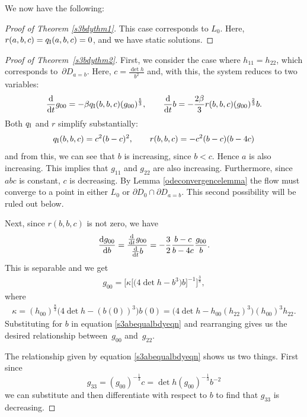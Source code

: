 \documentclass[10pt,a4paper]{amsart}
\numberwithin{equation}{section}
\newcommand{\dtime}{\frac{{\rm d}}{{\rm d} t}} %
\begin{document}
We now have the following:

\begin{proof}[Proof of Theorem \ref{s3bdythm1}]
This case corresponds to $L_0$. Here, $r(a, b, c) = q_{\rm I}(a, b, c) = 0$, and we have static solutions.
\end{proof}

\begin{proof}[Proof of Theorem~\ref{s3bdythm2}]
First, we consider the case where $h_{11} = h_{22}$, which corresponds to~$\partial D_{a = b}$. Here, $c = \frac{\det h}{b^2}$ and, with this, the system reduces to two variables:
\begin{gather*}
\dtime g_{00} = - \beta q_{\rm I}(b, b, c) (g_{00})^{\frac{5}{3}},\qquad
\dtime b = - \frac{2 \beta}{3} r(b, b, c) (g_{00})^{\frac{2}{3}} b.
\end{gather*}
Both $q_{\rm I}$ and $r$ simplify substantially:
\begin{gather*}
q_{\rm I}(b, b, c) = c^2 (b - c)^2,\qquad
r(b, b, c) = -c^2 (b - c) (b - 4c)
\end{gather*}
and from this, we can see that $b$ is increasing, since $b < c$. Hence $a$ is also increasing. This implies that $g_{11}$ and $g_{22}$ are also increasing. Furthermore, since $abc$ is constant, $c$ is decreasing. By Lemma \ref{odeconvergencelemma} the flow must converge to a point in either $L_0$ or $\partial D_0 \cap \partial D_{a=b}$. This second possibility will be ruled out below.

Next, since $r(b, b, c)$ is not zero, we have
\begin{equation*}
\frac{{\rm d} g_{00}}{{\rm d} b} = \frac{\dtime g_{00}}{\dtime b}
				= -\frac{3}{2} \frac{b - c}{b - 4c} \frac{g_{00}}{b}.
\end{equation*}
This is separable and we get
\begin{gather} \label{s3abequalbdyeqn}
g_{00} = \bigl[\kappa \bigl[\big(4 \det h - b^3\big) b \bigr]^{-1} \bigr]^{\frac{3}{8}},
\end{gather}
where
\begin{gather*}
\kappa = (h_{00})^{\frac{8}{3}} \big(4 \det h - (b(0))^3\big) b(0)
	 = \big(4 \det h - h_{00} (h_{22})^3\big) (h_{00})^3 h_{22}.
\end{gather*}
Substituting for $b$ in equation \eqref{s3abequalbdyeqn} and rearranging gives us the desired relationship between~$g_{00}$ and~$g_{22}$.

The relationship given by equation \eqref{s3abequalbdyeqn} shows us two things. First since
\[
g_{33} = (g_{00})^{-\frac{1}{3}} c = \det h (g_{00})^{-\frac{1}{3}}b^{-2}
\]
we can substitute and then differentiate with respect to $b$ to find that $g_{33}$ is decreasing.


\end{proof}
\end{document}
